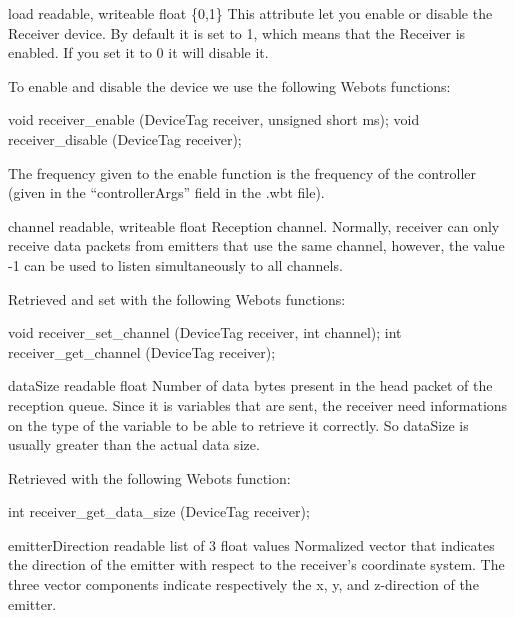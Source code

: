 \begin{itemize}
\begin{attribute}{load}
  {readable, writeable}
  {float}
  {\{0,1\}}
  This attribute let you enable or disable the Receiver
  device.  By default it is set to 1, which means that the Receiver is
  enabled. If you set it to 0 it will disable it.

  To enable and disable the device we use the following Webots functions:

\begin{cxx}
void receiver_enable  (DeviceTag receiver, unsigned short ms);
void receiver_disable (DeviceTag receiver);
\end{cxx}

The frequency given to the enable function is the frequency of the
\urbi controller (given in the ``controllerArgs'' field in the .wbt
file).
\end{attribute}

\begin{attribute}{channel}
  {readable, writeable}
  {float}
  {}
  Reception channel. Normally, receiver can only receive
  data packets from emitters that use the same channel, however, the
  value -{}1 can be used to listen simultaneously to all channels.

  Retrieved and set with the following Webots functions:
\begin{cxx}
void receiver_set_channel  (DeviceTag receiver, int channel);
int receiver_get_channel (DeviceTag receiver);
\end{cxx}
\end{attribute}

\begin{attribute}{dataSize}
  {readable}
  {float}
  {}
  Number of data bytes present in the head packet of the
  reception queue. Since it is \urbi variables that are sent, the
  receiver need informations on the type of the variable to be able to
  retrieve it correctly. So dataSize is usually greater than the actual
  data size.

  Retrieved with the following Webots function:

\begin{cxx}
int receiver_get_data_size  (DeviceTag receiver);
\end{cxx}
\end{attribute}

\begin{attribute}{emitterDirection}
  {readable}
  {list of 3 float values}
  {}
  Normalized vector that indicates the direction of the
  emitter with respect to the receiver's coordinate system. The three
  vector components indicate respectively the x, y, and z-{}direction
  of the emitter.


\end{attribute}
\end{itemize}

